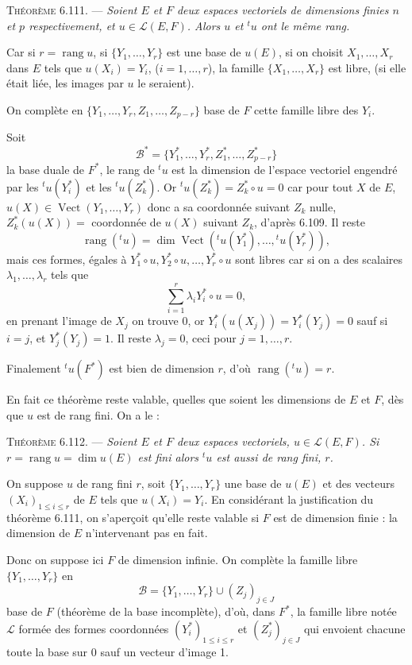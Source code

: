 \medskip\noindent\textsc{Théorème 6.111.} --- \emph{Soient $E$ et $F$ deux espaces vectoriels de dimensions finies $n$ et $p$ respectivement, et $u\in\mathcal L(E,F)$. Alors $u$ et ${}^tu$ ont le même rang.}

Car si $r=\operatorname{rang}u$, si $\{Y_1,\ldots,Y_r\}$ est une base de $u(E)$, si on choisit $X_1,\ldots,X_r$ dans $E$ tels que $u(X_i)=Y_i$, ($i=1,\ldots,r$), la famille $\{X_1,\ldots,X_r\}$ est libre, (si elle était liée, les images par $u$ le seraient).

On complète en $\{Y_1,\ldots,Y_r,Z_1,\ldots,Z_{p-r}\}$ base de $F$ cette famille libre des $Y_i$.

Soit
\[
\mathcal B^*=\{Y_1^*,\ldots,Y_r^*,Z_1^*,\ldots,Z_{p-r}^*\}
\]
la base duale de $F^*$, le rang de ${}^tu$ est la dimension de l'espace vectoriel engendré par les ${}^tu(Y_i^*)$ et les ${}^tu(Z_k^*)$. Or ${}^tu(Z_k^*)=Z_k^*\circ u=0$ car pour tout $X$ de $E$, $u(X)\in\operatorname{Vect}(Y_1,\ldots,Y_r)$ donc a sa coordonnée suivant $Z_k$ nulle, $Z_k^*(u(X))=$ coordonnée de $u(X)$ suivant $Z_k$, d'après 6.109. Il reste
\[
\operatorname{rang}({}^tu)=\dim\operatorname{Vect}({}^tu(Y_1^*),\ldots,{}^tu(Y_r^*)),
\]
mais ces formes, égales à $Y_1^*\circ u,Y_2^*\circ u,\ldots,Y_r^*\circ u$ sont libres car si on a des scalaires $\lambda_1,\ldots,\lambda_r$ tels que
\[
\sum_{i=1}^r\lambda_iY_i^*\circ u=0,
\]
en prenant l'image de $X_j$ on trouve 0, or $Y_i^*(u(X_j))=Y_i^*(Y_j)=0$ sauf si $i=j$, et $Y_j^*(Y_j)=1$. Il reste $\lambda_j=0$, ceci pour $j=1,\ldots,r$.

Finalement ${}^tu(F^*)$ est bien de dimension $r$, d'où $\operatorname{rang}({}^tu)=r$. \bookend

En fait ce théorème reste valable, quelles que soient les dimensions de $E$ et $F$, dès que $u$ est de rang fini. On a le :

\medskip\noindent\textsc{Théorème 6.112.} --- \emph{Soient $E$ et $F$ deux espaces vectoriels, $u\in\mathcal L(E,F)$. Si $r=\operatorname{rang}u=\dim u(E)$ est fini alors ${}^tu$ est aussi de rang fini, $r$.}

On suppose $u$ de rang fini $r$, soit $\{Y_1,\ldots,Y_r\}$ une base de $u(E)$ et des vecteurs $(X_i)_{1\le i\le r}$ de $E$ tels que $u(X_i)=Y_i$. En considérant la justification du théorème 6.111, on s'aperçoit qu'elle reste valable si $F$ est de dimension finie : la dimension de $E$ n'intervenant pas en fait.

Donc on suppose ici $F$ de dimension infinie. On complète la famille libre $\{Y_1,\ldots,Y_r\}$ en
\[
\mathcal B=\{Y_1,\ldots,Y_r\}\cup(Z_j)_{j\in J}
\]
base de $F$ (théorème de la base incomplète), d'où, dans $F^*$, la famille libre notée $\mathcal L$ formée des formes coordonnées $(Y_i^*)_{1\le i\le r}$ et $(Z_j^*)_{j\in J}$ qui envoient chacune toute la base sur 0 sauf un vecteur d'image 1.

